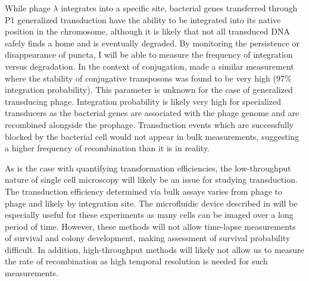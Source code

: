 While phage $\lambda$ integrates into a specific site,
bacterial genes transferred through P1 generalized transduction have the ability
to be integrated into its native position in the chromosome, although it is
likely that not all transduced DNA safely finds a home and is eventually degraded. By
monitoring the persistence or disappearance of puncta, I will be able to measure
the frequency of integration versus degradation. In the context of conjugation,
\citet{Babic:2008bl} made a similar measurement where the stability of
conjugative transposons was found to be very high (97\% integration
probability). This parameter is unknown for the case of generalized transducing
phage. Integration probability is likely very high for specialized transducers
as the bacterial genes are associated with the phage genome and are recombined
alongside the prophage. Transduction events which are successfully blocked by
the bacterial cell would not appear in bulk measurements, suggesting a higher
frequency of recombination than it is in reality. 


As is the case with quantifying transformation efficiencies, the low-throughput
nature of single cell microscopy will likely be an issue for studying
transduction. The transduction efficiency determined via bulk assays varies from
phage to phage and likely by integration site. The microfluidic device described
in \citet{Lambert:2015bk, Lambert:2014gc} will be especially useful for these
experiments as many cells can be imaged over a long period of time. However,
these methods will not allow time-lapse measurements of survival and colony
development, making assessment of survival probability difficult. In addition,
high-throughput methods will likely not allow us to measure the rate of
recombination as high temporal resolution is needed for such measurements.




